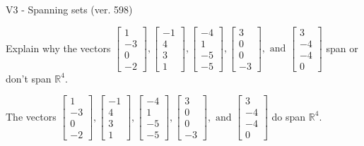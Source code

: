 \begin{exercise}
  \begin{exerciseTitle}V3 - Spanning sets (ver. 598)\end{exerciseTitle}
  \begin{exerciseStatement}
    Explain why the vectors \(\left[\begin{array}{r}
1 \\
-3 \\
0 \\
-2
\end{array}\right] , \left[\begin{array}{r}
-1 \\
4 \\
3 \\
1
\end{array}\right] , \left[\begin{array}{r}
-4 \\
1 \\
-5 \\
-5
\end{array}\right] , \left[\begin{array}{r}
3 \\
0 \\
0 \\
-3
\end{array}\right] , \text{ and } \left[\begin{array}{r}
3 \\
-4 \\
-4 \\
0
\end{array}\right]\) span or don't span \(\mathbb{R}^4\). 
	


  \end{exerciseStatement}
  \begin{exerciseAnswer}
   The vectors \(\left[\begin{array}{r}
1 \\
-3 \\
0 \\
-2
\end{array}\right] , \left[\begin{array}{r}
-1 \\
4 \\
3 \\
1
\end{array}\right] , \left[\begin{array}{r}
-4 \\
1 \\
-5 \\
-5
\end{array}\right] , \left[\begin{array}{r}
3 \\
0 \\
0 \\
-3
\end{array}\right] , \text{ and } \left[\begin{array}{r}
3 \\
-4 \\
-4 \\
0
\end{array}\right]\) 
  	 do  
	span \(\mathbb{R}^4\).
  



\end{exerciseAnswer}
\end{exercise}
